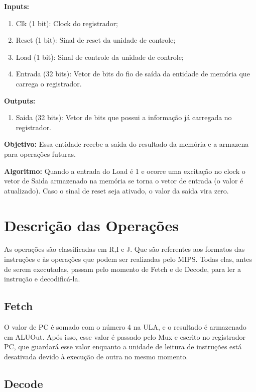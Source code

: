 \textbf{Inputs:}

\begin{enumerate}
    \item Clk (1 bit): Clock do registrador;
    \item Reset (1 bit): Sinal de reset da unidade de controle;
    \item Load (1 bit): Sinal de controle da unidade de controle;
    \item Entrada (32 bits): Vetor de bits do fio de saída da entidade de memória que carrega o registrador.
\end{enumerate}

\textbf{Outputs:}

\begin{enumerate}
    \item Saida (32 bits): Vetor de bits que possui a informação já carregada no registrador.
\end{enumerate}

\textbf{Objetivo:} Essa entidade recebe a saída do resultado da memória e a armazena para operações futuras.

\textbf{Algoritmo:} Quando a entrada do Load é 1 e ocorre uma excitação no clock o vetor de Saida armazenado na memória se torna o vetor de entrada (o valor é atualizado). Caso o sinal de reset seja ativado, o valor da saída vira zero.

\newpage

\section{Descrição das Operações}

As operações são classificadas em R,I e J. Que são referentes aos formatos das instruções e às operações que podem ser realizadas pelo MIPS. Todas elas, antes de serem executadas, passam pelo momento de Fetch e de Decode, para ler a instrução e decodificá-la.

\subsection{Fetch}

O valor de PC é somado com o número 4 na ULA, e o resultado é armazenado em ALUOut. Após isso, esse valor é passado pelo Mux e escrito no registrador PC, que guardará esse valor enquanto a unidade de leitura de instruções está desativada devido à execução de outra no mesmo momento.

\subsection{Decode}

